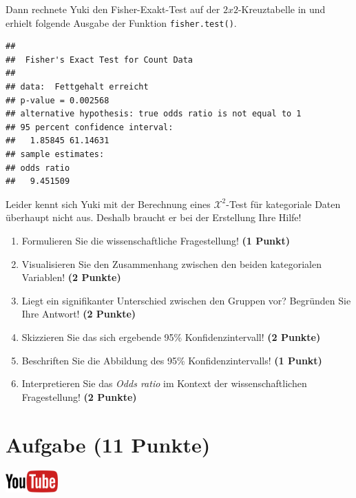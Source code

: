 \documentclass[a4paper, 9pt]{scrartcl}\usepackage[]{graphicx}\usepackage[]{xcolor}
\makeatletter
\newenvironment{kframe}{%
 \def\at@end@of@kframe{}%
 \ifinner\ifhmode%
  \def\at@end@of@kframe{\end{minipage}}%
  \begin{minipage}{\columnwidth}%
 \fi\fi%
 \def\FrameCommand##1{\hskip\@totalleftmargin \hskip-\fboxsep
 \colorbox{shadecolor}{##1}\hskip-\fboxsep
     \hskip-\linewidth \hskip-\@totalleftmargin \hskip\columnwidth}%
 \MakeFramed {\advance\hsize-\width
   \@totalleftmargin\z@ \linewidth\hsize
   \@setminipage}}%
 {\par\unskip\endMakeFramed%
 \at@end@of@kframe}
\newenvironment{knitrout}{}{} %
\makeatother
\begin{document}
Dann rechnete Yuki den Fisher-Exakt-Test auf der $2x2$-Kreuztabelle in \Rlogo und erhielt folgende \Rlogo Ausgabe der Funktion \texttt{fisher.test()}.

\begin{knitrout}
\color{fgcolor}\begin{kframe}
\begin{verbatim}
## 
## 	Fisher's Exact Test for Count Data
## 
## data:  Fettgehalt erreicht
## p-value = 0.002568
## alternative hypothesis: true odds ratio is not equal to 1
## 95 percent confidence interval:
##   1.85845 61.14631
## sample estimates:
## odds ratio 
##   9.451509
\end{verbatim}
\end{kframe}
\end{knitrout}

Leider kennt sich Yuki mit der Berechnung eines $\mathcal{X}^2$-Test für kategoriale Daten überhaupt nicht aus. Deshalb braucht er bei der Erstellung Ihre Hilfe!

\begin{enumerate}
\item Formulieren Sie die wissenschaftliche Fragestellung! \textbf{(1 Punkt)}
\item Visualisieren Sie den Zusammenhang zwischen den beiden kategorialen Variablen! \textbf{(2 Punkte)}
\item Liegt ein signifikanter Unterschied zwischen den Gruppen vor? Begründen Sie Ihre Antwort! \textbf{(2 Punkte)}
\item Skizzieren Sie das sich ergebende 95\% Konfidenzintervall! \textbf{(2 Punkte)}
\item Beschriften Sie die Abbildung des 95\% Konfidenzintervalls! \textbf{(1 Punkt)} 
\item Interpretieren Sie das \textit{Odds ratio} im Kontext der wissenschaftlichen Fragestellung! \textbf{(2 Punkte)} 
\end{enumerate}
 
\clearpage

\section{Aufgabe \hfill (11 Punkte)}

\hfill\href{https://youtu.be/VQlNl8hvRII}{\includegraphics[width =
  2cm]{img/youtube}}\\[1Ex]
\end{document}
